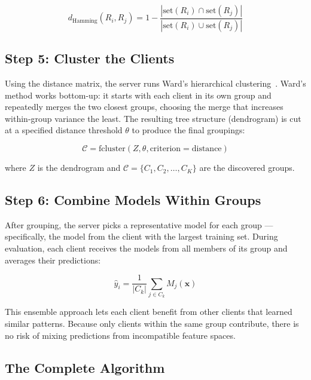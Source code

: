 \documentclass[12pt,a4paper]{article}
\begin{document}
\begin{equation}\label{eq:hamming}
  d_{\text{Hamming}}(R_i, R_j) = 1 - \frac{|\text{set}(R_i) \cap \text{set}(R_j)|}{|\text{set}(R_i) \cup \text{set}(R_j)|}
\end{equation}

\subsection{Step 5: Cluster the Clients}

Using the distance matrix, the server runs Ward's hierarchical clustering~\cite{ward1963hierarchical}. Ward's method works bottom-up: it starts with each client in its own group and repeatedly merges the two closest groups, choosing the merge that increases within-group variance the least. The resulting tree structure (dendrogram) is cut at a specified distance threshold $\theta$ to produce the final groupings:

\begin{equation}
  \mathcal{C} = \text{fcluster}(Z, \theta, \text{criterion} = \text{distance})
\end{equation}

where $Z$ is the dendrogram and $\mathcal{C} = \{C_1, C_2, \ldots, C_K\}$ are the discovered groups.

\subsection{Step 6: Combine Models Within Groups}

After grouping, the server picks a representative model for each group --- specifically, the model from the client with the largest training set. During evaluation, each client receives the models from all members of its group and averages their predictions:

\begin{equation}\label{eq:ensemble}
  \hat{y}_i = \frac{1}{|C_k|} \sum_{j \in C_k} M_j(\mathbf{x})
\end{equation}

This ensemble approach lets each client benefit from other clients that learned similar patterns. Because only clients within the same group contribute, there is no risk of mixing predictions from incompatible feature spaces.

\subsection{The Complete Algorithm}
\end{document}
